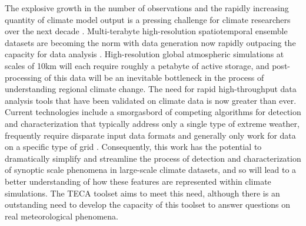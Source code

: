 \documentclass[11pt]{article}
\begin{document}
The explosive growth in the number of observations and the rapidly increasing quantity of climate model output is a pressing challenge for climate researchers over the next decade \citep{levy2012bigdata}.  Multi-terabyte high-resolution spatiotemporal ensemble datasets are becoming the norm with data generation now rapidly outpacing the capacity for data analysis \citep{ganguly2008data}.  High-resolution global atmospheric simulations at scales of 10km will each require roughly a petabyte of active storage, and post-processing of this data will be an inevitable bottleneck in the process of understanding regional climate change.  The need for rapid high-throughput data analysis tools that have been validated on climate data is now greater than ever.  Current technologies include a smorgasbord of competing algorithms for detection and characterization that typically address only a single type of extreme weather, frequently require disparate input data formats and generally only work for data on a specific type of grid \citep{neu2013imilast}.  Consequently, this work has the potential to dramatically simplify and streamline the process of detection and characterization of synoptic scale phenomena in large-scale climate datasets, and so will lead to a better understanding of how these features are represented within climate simulations.  The TECA toolset \citep{PORSBKWFLMWWB2012PCS} aims to meet this need, although there is an outstanding need to develop the capacity of this toolset to answer questions on real meteorological phenomena.


\end{document}
